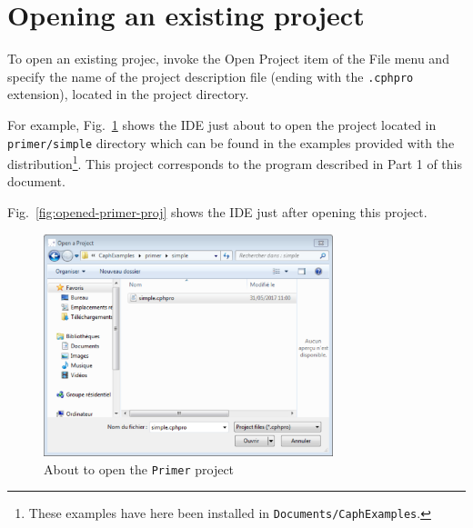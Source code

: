 
\section{Opening an existing project}
\label{sec:opening-a-project}

To open an existing projec, invoke the \textsf{Open Project} item of the
\textsf{File} menu and specify the name of the project description file (ending with the
\verb|.cphpro| extension), located in the project directory.

\medskip
For example, Fig.~\ref{fig:opening-primer-proj} shows the IDE
just about to open the project located in \texttt{primer/simple} directory which can be found in the
examples provided with the \caph distribution\footnote{These examples have here been installed in
  \texttt{Documents/CaphExamples}.}. This project corresponds to the program described in Part 1 of
this document. 

Fig.~\ref{fig:opened-primer-proj} shows the IDE just after opening this project.
 
\begin{figure}[h]
  \centering
  \includegraphics[width=0.75\textwidth]{figs/ide/opening-project}
  \caption{About to open the \texttt{Primer} project}
  \label{fig:opening-primer-proj}
\end{figure}

